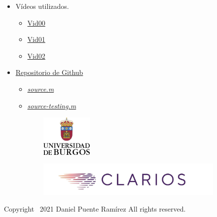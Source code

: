 \documentclass[11pt]{memoir}
\begin{document}
\begin{itemize}
\item Vídeos utilizados.
\begin{itemize}
\item \href{https://universidaddeburgos-my.sharepoint.com/:v:/g/personal/dpr1005_alu_ubu_es/EblH-8CwOBxFveSSffVrCSIBAsXnm-RjX1KjU1Q9CDcHGw?e=4ioTBW}{Vid00}
\item \href{https://universidaddeburgos-my.sharepoint.com/:v:/g/personal/dpr1005_alu_ubu_es/EbD-vo49t31ItwpNTlBO92EBx-xBuX7tSuepVe4B4PEW_Q?e=58hLev}{Vid01}
\item \href{https://universidaddeburgos-my.sharepoint.com/:v:/g/personal/dpr1005_alu_ubu_es/EWApw-KIdKdNvyhZXxp9HywBpRJ9XWvZNaMFYzPMy5yTpA?e=sH9AGl}{Vid02}
\end{itemize}
\item \href{https://github.com/dpr1005/Car-battery-detection-system}{Repositorio de Github}
\begin{itemize}
\item \href{https://github.com/dpr1005/Car-battery-detection-system/blob/master/source.m}{\textit{source.m}}
\item \href{https://github.com/dpr1005/Car-battery-detection-system/blob/master/source_testing.m}{\textit{source-testing.m}}
\end{itemize}
\end{itemize}
\vspace{2cm}


\clearpage
\thispagestyle{empty}
\vspace*{\fill}
\begin{center}
\begin{figure}[b]
\begin{subfigure}{0.4\textwidth}
    \includegraphics[height=2cm]{img/Escudo}
\end{subfigure}
\hfill
\begin{subfigure}{0.4\textwidth}
    \includegraphics[width=\textwidth]{img/Clarios}
\end{subfigure}
\end{figure}
\end{center}

Copyright \textcopyright\ 2021 Daniel Puente Ramírez All rights reserved.


    
\end{document}

